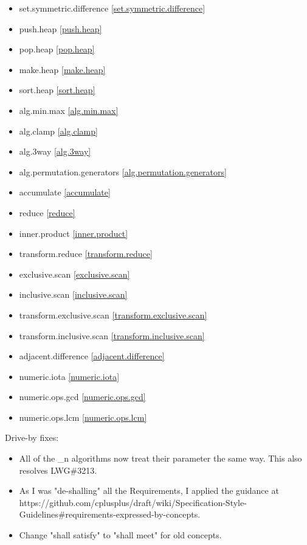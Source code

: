 \begin{multicols}{3}
\begin{itemize}
\item{set.symmetric.difference}		\ref{set.symmetric.difference}
\item{push.heap}					\ref{push.heap}
\item{pop.heap}						\ref{pop.heap}
\item{make.heap}					\ref{make.heap}
\item{sort.heap}					\ref{sort.heap}
\item{alg.min.max}					\ref{alg.min.max}
\item{alg.clamp}					\ref{alg.clamp}
\item{alg.3way}						\ref{alg.3way}
\item{alg.permutation.generators}	\ref{alg.permutation.generators}
\item{accumulate}					\ref{accumulate}
\item{reduce}						\ref{reduce}
\item{inner.product}				\ref{inner.product}
\item{transform.reduce}				\ref{transform.reduce}
\item{exclusive.scan}				\ref{exclusive.scan}
\item{inclusive.scan}				\ref{inclusive.scan}
\item{transform.exclusive.scan}		\ref{transform.exclusive.scan}
\item{transform.inclusive.scan}		\ref{transform.inclusive.scan}
\item{adjacent.difference}			\ref{adjacent.difference}
\item{numeric.iota}					\ref{numeric.iota}
\item{numeric.ops.gcd}				\ref{numeric.ops.gcd}
\item{numeric.ops.lcm}				\ref{numeric.ops.lcm}
\end{itemize}
\end{multicols}

Drive-by fixes:
\begin{itemize}
\item{All of the \*_n algorithms now treat their  parameter the same way. This also resolves LWG\#3213.}
\item{As I was "de-shalling" all the Requirements, I applied the guidance at https://github.com/cplusplus/draft/wiki/Specification-Style-Guidelines\#requirements-expressed-by-concepts.}
\item{Change "shall satisfy" to "shall meet" for old concepts.}
\end{itemize}

